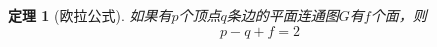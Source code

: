 \documentclass{article}
\begin{document}
\begin{CJK}{UTF8}{gbsn}
  \newtheorem*{Thm}{定理}
  \huge
\begin{Thm}[欧拉公式]
    如果有$p$个顶点$q$条边的平面连通图$G$有$f$个面，则
      \[p - q + f = 2\]
\end{Thm}

\end{CJK}
\end{document}

